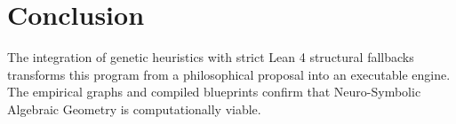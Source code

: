 \section{Conclusion}
The integration of genetic heuristics with strict Lean 4 structural fallbacks transforms this program from a philosophical proposal into an executable engine. The empirical graphs and compiled blueprints confirm that Neuro-Symbolic Algebraic Geometry is computationally viable.
